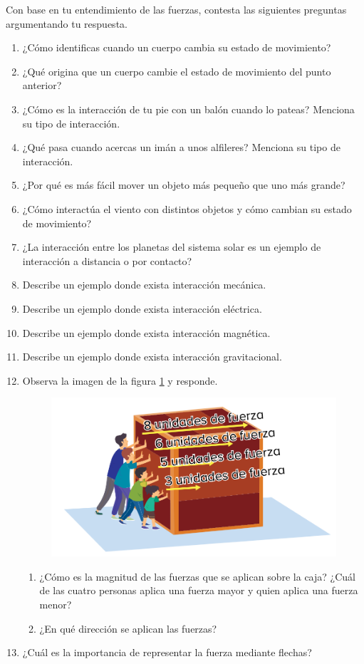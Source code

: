 \documentclass[11pt]{book}
\begin{document}
\begin{boxK}
  Con base en tu entendimiento de las fuerzas, contesta las siguientes preguntas argumentando tu respuesta.

  \begin{enumerate}
    \item ¿Cómo identificas cuando un cuerpo cambia su estado de movimiento?
    \item ¿Qué origina que un cuerpo cambie el estado de movimiento del punto anterior?
    \item ¿Cómo es la interacción de tu pie con un balón cuando lo pateas? Menciona su tipo de interacción.
    \item ¿Qué pasa cuando acercas un imán a unos alfileres? Menciona su tipo de interacción.
    \item ¿Por qué es más fácil mover un objeto más pequeño que uno más grande?
    \item ¿Cómo interactúa el viento con distintos objetos y cómo cambian su estado de movimiento?
    \item ¿La interacción entre los planetas del sistema solar es un ejemplo de interacción a distancia o por contacto?
    \item Describe un ejemplo donde exista interacci\'on mecánica.
    \item Describe un ejemplo donde exista interacci\'on eléctrica.
    \item Describe un ejemplo donde exista interacci\'on magnética.
    \item Describe un ejemplo donde exista interacci\'on gravitacional.
    \item Observa la imagen de la figura \ref{fig:unidades_fuerza} y responde.

          \begin{figure}[H]
            \centering
            \includegraphics[width=.6\linewidth]{unidades_fuerza.png}
            \label{fig:unidades_fuerza}
          \end{figure}
          \begin{enumerate}
            \item ¿Cómo es la magnitud de las fuerzas que se aplican sobre la caja? ¿Cuál de las cuatro personas aplica una fuerza mayor y quien aplica una fuerza menor?
            \item ¿En qué dirección se aplican las fuerzas?
          \end{enumerate}
    \item ¿Cuál es la importancia de representar la fuerza mediante flechas?
  \end{enumerate}
\end{boxK}
\end{document}
